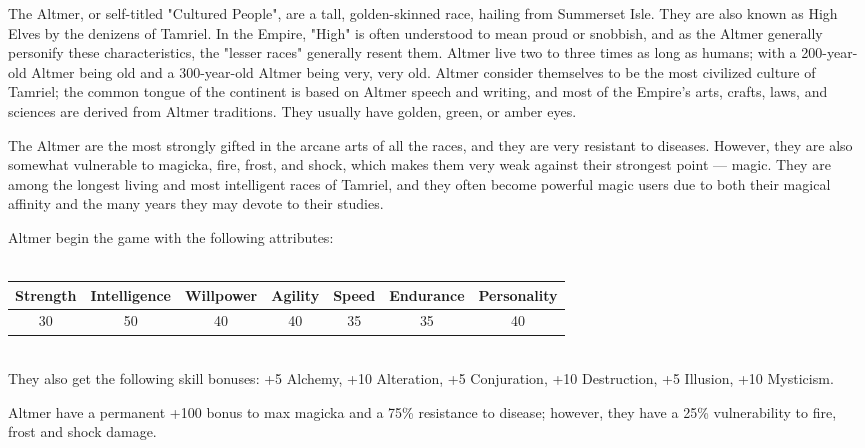 \documentclass[12pt]{book}
\begin{document}
The Altmer, or self-titled "Cultured People", are a tall, golden-skinned race, hailing from Summerset Isle. They are also known as High Elves by the denizens of Tamriel. In the Empire, "High" is often understood to mean proud or snobbish, and as the Altmer generally personify these characteristics, the "lesser races" generally resent them. Altmer live two to three times as long as humans; with a 200-year-old Altmer being old and a 300-year-old Altmer being very, very old. Altmer consider themselves to be the most civilized culture of Tamriel; the common tongue of the continent is based on Altmer speech and writing, and most of the Empire's arts, crafts, laws, and sciences are derived from Altmer traditions. They usually have golden, green, or amber eyes.

The Altmer are the most strongly gifted in the arcane arts of all the races, and they are very resistant to diseases. However, they are also somewhat vulnerable to magicka, fire, frost, and shock, which makes them very weak against their strongest point --- magic. They are among the longest living and most intelligent races of Tamriel, and they often become powerful magic users due to both their magical affinity and the many years they may devote to their studies.

Altmer begin the game with the following attributes:\\~\\
\begin{tabular}{|c|c|c|c|c|c|c|}
\hline
Strength & Intelligence & Willpower & Agility & Speed & Endurance & Personality\\ \hline
30 & 50 & 40 & 40 & 35 & 35 & 40\\ \hline

\end{tabular}\\

They also get the following skill bonuses: +5 Alchemy, +10 Alteration, +5 Conjuration, +10 Destruction, +5 Illusion, +10 Mysticism.

Altmer have a permanent +100 bonus to max magicka and a 75\% resistance to disease; however, they have a 25\% vulnerability to fire, frost and shock damage.\\
\end{document}
